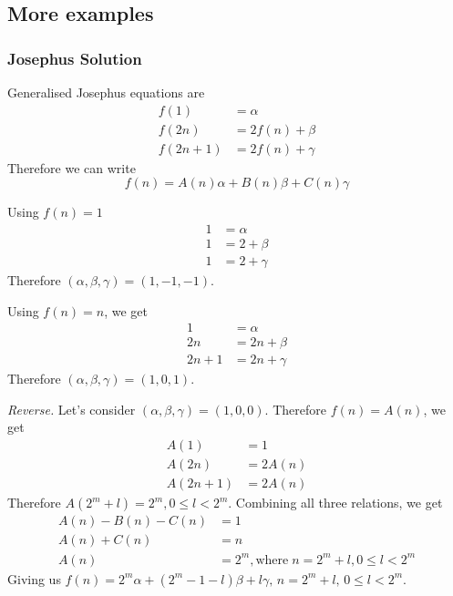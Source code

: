 \subsection{More examples}
\subsubsection{Josephus Solution}
Generalised Josephus equations are
\begin{align*}
    f(1) & = \alpha \\
    f(2n) &= 2f(n)+ \beta \\
    f(2n+1) &= 2f(n)+ \gamma 
\end{align*}
Therefore we can write 
$$f(n)=A(n)\alpha+B(n)\beta+C(n)\gamma$$

Using $f(n)=1$
\begin{align*}
    1 &= \alpha \\
    1 &= 2+\beta \\
    1 &= 2+\gamma
\end{align*}
Therefore $(\alpha,\beta,\gamma)=(1,-1,-1)$.

Using $f(n)=n$, we get
\begin{align*}
    1 &=\alpha \\
    2n &= 2n+\beta \\
    2n+1&= 2n+\gamma
\end{align*}
Therefore $(\alpha,\beta,\gamma)=(1,0,1)$.

\emph{Reverse.} Let's consider $(\alpha,\beta,\gamma)=(1,0,0)$. Therefore $f(n)=A(n)$, we get
\begin{align*}
    A(1) &= 1\\
    A(2n)&=2A(n) \\
    A(2n+1)&=2A(n)
\end{align*}
Therefore $A(2^m+l)=2^m, 0 \le l < 2^m$. Combining all three relations, we get
\begin{align*}
    A(n)-B(n)-C(n) &= 1 \\
    A(n)+C(n) &=n\\
    A(n) &= 2^m, \text{where} \; n=2^m+l, 0 \le l < 2^m
\end{align*}
Giving us $f(n) = 2^m \alpha + (2^m-1-l) \beta + l \gamma, \, n=2^m+l, \, 0\le l< 2^m$.

